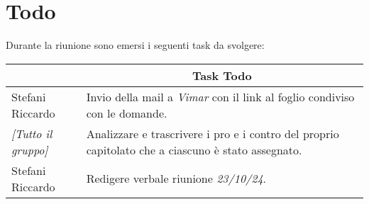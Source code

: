 \section{Todo}

Durante la riunione sono emersi i seguenti task da svolgere:

\vspace{0.5cm}

\begin{table}[htbp]
\begin{tabular}{|p{}|p{}|}
    \hline
    \rowcolor[gray]{0.9}
    \multicolumn{1}{|c|}{\textbf{Assegnatario}} & \multicolumn{1}{|c|}{\textbf{Task Todo}} \\
    \hline
    Stefani Riccardo & Invio della mail a \emph{Vimar} con il link al foglio condiviso con le domande. \\
    \hline
    \emph{[Tutto il gruppo]} & Analizzare e trascrivere i pro e i contro del proprio capitolato che a ciascuno è stato assegnato. \\
    \hline
    Stefani Riccardo & Redigere verbale riunione \emph{23/10/24}. \\
    \hline
\end{tabular}
\end{table}
